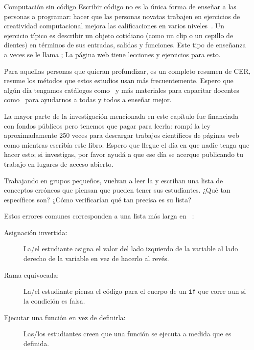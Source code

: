 \begin{aside}{Computación sin código}
  Escribir código no es la única forma de enseñar a las personas a programar:
  hacer que las personas novatas trabajen en ejercicios de creatividad computacional mejora las calificaciones en varios niveles~\cite{Shel2017}.
  Un ejercicio típico es describir un objeto cotidiano (como un clip o un cepillo de dientes)
  en términos de sus entradas, salidas y funciones.
  Este tipo de enseñanza a veces se le llama ;
  La página web  tiene lecciones y ejercicios para esto.
\end{aside}


Para aquellas personas que quieran profundizar,
\cite{Finc2019} es un completo resumen de CER,
\cite{Ihan2016} resume los métodos que estos estudios usan más frecuentemente.
Espero que algún día tengamos catálogos como~\cite{Ojos2015}
y más materiales para capacitar docentes como~\cite{Hazz2014,Guzd2015a,Sent2018}
para ayudarnos a todas y todos a enseñar mejor.

La mayor parte de la investigación mencionada en este capítulo fue financiada con fondos públicos
pero tenemos que pagar para leerla:
rompí la ley aproximadamente 250 veces 
para descargar trabajos científicos de páginas web como 
mientras escribía este libro.
Espero que llegue el día en que nadie tenga que hacer esto;
si investigas,
por favor ayudá a que ese día se acerque publicando tu trabajo en lugares de acceso abierto.



Trabajando en grupos pequeños,
vuelvan a leer la  y escriban una lista de conceptos erróneos que piensan que pueden tener sus estudiantes.
¿Qué tan específicos son?
¿Cómo verificarían qué tan precisa es su lista?


Estos errores comunes corresponden a una lista más larga en ~\cite{Sirk2012}:

\begin{description}

\item[Asignación invertida:]
  La/el estudiante asigna el valor del lado izquierdo de la variable al lado derecho de la variable
  en vez de hacerlo al revés. 

\item[Rama equivocada:]
  La/el estudiante piensa el código para el cuerpo de un \texttt{if} que corre
  aun si la condición es falsa.

\item[Ejecutar una función en vez de definirla:]
  Las/los estudiantes creen que una función se ejecuta a medida que es definida.

\end{description}

